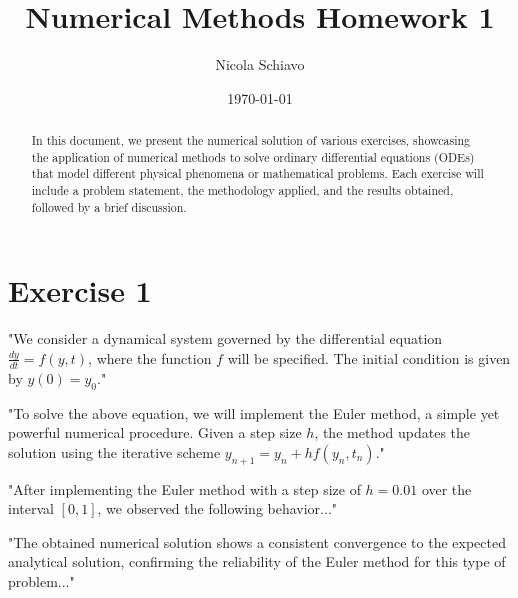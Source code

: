 \documentclass[a4paper,12pt]{article}
\title{Numerical Methods Homework 1}
\author{Nicola Schiavo}
\date{\today}
\begin{document}
\maketitle

\begin{abstract}
In this document, we present the numerical solution of various exercises, showcasing the application of numerical methods to solve ordinary differential equations (ODEs) that model different physical phenomena or mathematical problems. Each exercise will include a problem statement, the methodology applied, and the results obtained, followed by a brief discussion.
\end{abstract}

\section{Exercise 1}

"We consider a dynamical system governed by the differential equation $\frac{dy}{dt} = f(y, t)$, where the function $f$ will be specified. The initial condition is given by $y(0) = y_0$."

"To solve the above equation, we will implement the Euler method, a simple yet powerful numerical procedure. Given a step size $h$, the method updates the solution using the iterative scheme $y_{n+1} = y_n + h f(y_n, t_n)$."

"After implementing the Euler method with a step size of $h = 0.01$ over the interval $[0, 1]$, we observed the following behavior..."



"The obtained numerical solution shows a consistent convergence to the expected analytical solution, confirming the reliability of the Euler method for this type of problem..."


%
%
\end{document}
